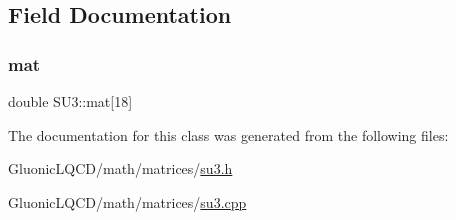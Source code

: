 \subsection{Field Documentation}
\mbox{\label{class_s_u3_af003668305abe616f56568a075434be0}} 
\subsubsection{\texorpdfstring{mat}{mat}}
{\footnotesize\ttfamily double S\+U3\+::mat\mbox{[}18\mbox{]}}



The documentation for this class was generated from the following files\+:\begin{DoxyCompactItemize}
\item 
Gluonic\+L\+Q\+C\+D/math/matrices/\mbox{\hyperlink{su3_8h}{su3.\+h}}\item 
Gluonic\+L\+Q\+C\+D/math/matrices/\mbox{\hyperlink{su3_8cpp}{su3.\+cpp}}\end{DoxyCompactItemize}
